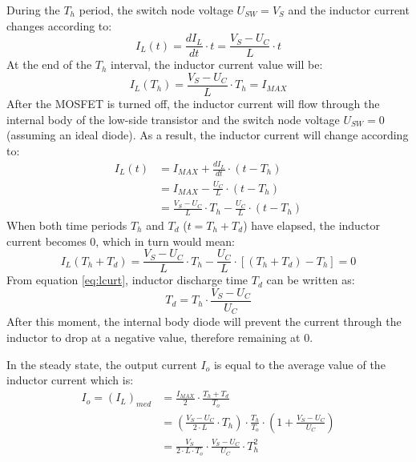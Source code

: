 During the $T_h$ period, the switch node voltage $U_{SW} = V_S$ and the inductor current changes according to:
\begin{equation}
    I_L(t) = \frac{dI_L}{dt} \cdot t = \frac{V_S - U_C}{L} \cdot t
\end{equation}
At the end of the $T_h$ interval, the inductor current value will be:
\begin{equation}
    I_L(T_h) = \frac{V_S - U_C}{L} \cdot T_h = I_{MAX}
\end{equation}
After the MOSFET is turned off, the inductor current will flow through the internal body of the low-side transistor and the switch node voltage $U_{SW} = 0$ (assuming an ideal diode).
As a result, the inductor current will change according to:
\begin{equation}
    \begin{split}
        I_L(t) &= I_{MAX} + \frac{dI_L}{dt} \cdot(t - T_h)  \\
        &= I_{MAX} - \frac{U_C}{L} \cdot (t - T_h) \\
        &= \frac{V_S - U_C}{L} \cdot T_h - \frac{U_C}{L} \cdot (t - T_h)
    \end{split}
\end{equation}
When both time periods $T_h$ and $T_d$ ($t = T_h + T_d$) have elapsed, the inductor current becomes 0, which in turn would mean:
\begin{equation}
    \label{eq:lcurt}
    I_L(T_h + T_d) = \frac{V_S - U_C}{L} \cdot T_h - \frac{U_C}{L} \cdot [(T_h + T_d) - T_h] = 0
\end{equation}
From equation \eqref{eq:lcurt}, inductor discharge time $T_d$ can be written as:
\begin{equation}
    T_d = T_h \cdot \frac{V_S - U_C}{U_C}
\end{equation}
After this moment, the internal body diode will prevent the current through the inductor to drop at a negative value, therefore remaining at 0.

In the steady state, the output current $I_o$ is equal to the average value of the inductor current which is:
\begin{equation}
    \begin{split}
        I_o = (I_L)_{med} &= \frac{I_{MAX}}{2} \cdot \frac{T_h + T_d}{T_o} \\
        &= \left(\frac{V_S - U_C}{2 \cdot L} \cdot T_h\right) \cdot \frac{T_h}{T_o} \cdot \left(1 + \frac{V_S - U_C}{U_C}\right) \\
        &= \frac{V_S}{2 \cdot L \cdot T_o} \cdot \frac{V_S - U_C}{U_C} \cdot T_h^2
    \end{split}
\end{equation}


